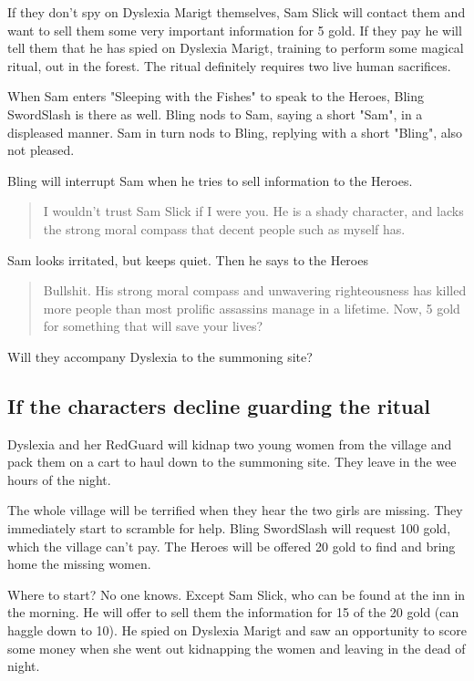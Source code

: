 \documentclass[11pt, twoside, titlepage, a4paper]{report}
\newenvironment{readoutloud}%
{\begin{quote}\begin{itshape}}%
{\end{itshape}\end{quote}}%
\begin{document}
If they don't spy on Dyslexia Marigt themselves, Sam Slick will contact them and want to sell them some very important information for 5 gold. If they pay he will tell them that he has spied on Dyslexia Marigt, training to perform some magical ritual, out in the forest. The ritual definitely requires two live human sacrifices.

When Sam enters "Sleeping with the Fishes" to speak to the Heroes, Bling SwordSlash is there as well. Bling nods to Sam, saying a short "Sam", in a displeased manner. Sam in turn nods to Bling, replying with a short "Bling", also not pleased.

Bling will interrupt Sam when he tries to sell information to the Heroes.
\begin{readoutloud}
I wouldn't trust Sam Slick if I were you. He is a shady character, and lacks the strong moral compass that decent people such as myself has.
\end{readoutloud}
Sam looks irritated, but keeps quiet. Then he says to the Heroes
\begin{readoutloud}
Bullshit. His strong moral compass and unwavering righteousness has killed more people than most prolific assassins manage in a lifetime. Now, 5 gold for something that will save your lives?
\end{readoutloud}

Will they accompany Dyslexia to the summoning site?


\subsection*{If the characters decline guarding the ritual}
Dyslexia and her RedGuard will kidnap two young women from the village and pack them on a cart to haul down to the summoning site. They leave in the wee hours of the night.

The whole village will be terrified when they hear the two girls are missing. They immediately start to scramble for help. Bling SwordSlash will request 100 gold, which the village can't pay. The Heroes will be offered 20 gold to find and bring home the missing women.

Where to start? No one knows. Except Sam Slick, who can be found at the inn in the morning. He will offer to sell them the information for 15 of the 20 gold (can haggle down to 10). He spied on Dyslexia Marigt and saw an opportunity to score some money when she went out kidnapping the women and leaving in the dead of night.
\end{document}
